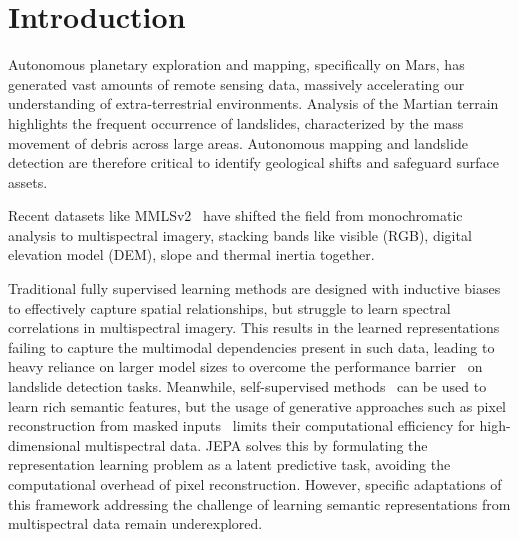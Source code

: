 \section{Introduction}
\label{sec:introduction}


Autonomous planetary exploration and mapping, specifically on Mars, has generated vast amounts of remote sensing data, massively accelerating our understanding of extra-terrestrial environments. Analysis of the Martian terrain highlights the frequent occurrence of landslides, characterized by the mass movement of debris across large areas. Autonomous mapping and landslide detection are therefore critical to identify geological shifts and safeguard surface assets.

Recent datasets like MMLSv2~\cite{mmlsv2_2026} have shifted the field from monochromatic analysis to multispectral imagery, stacking bands like visible (RGB), digital elevation model (DEM), slope and thermal inertia together.

Traditional fully supervised learning methods are designed with inductive biases to effectively capture spatial relationships, but struggle to learn spectral correlations in multispectral imagery. This results in the learned representations failing to capture the multimodal dependencies present in such data, leading to heavy reliance on larger model sizes to overcome the performance barrier~\cite{kabir2026dualswinfusionsegmultimodalmartianlandslide} on landslide detection tasks.
Meanwhile, self-supervised methods~\cite{Ericsson_2022} can be used to learn rich semantic features, but the usage of generative approaches such as pixel reconstruction from masked inputs~\cite{he2022masked} limits their computational efficiency for high-dimensional multispectral data. JEPA solves this by formulating the representation learning problem as a latent predictive task, avoiding the computational overhead of pixel reconstruction. However, specific adaptations of this framework addressing the challenge of learning semantic representations from multispectral data remain underexplored.

